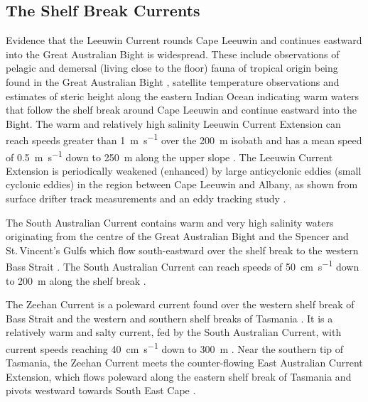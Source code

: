 \documentclass[preprint,3p,review,12pt]{elsarticle}
\begin{document}
\subsection{The Shelf Break Currents} \label{The Shelf Break Currents}
Evidence that the Leeuwin Current rounds Cape Leeuwin and continues eastward into the Great Australian Bight is widespread. These include observations of pelagic and demersal (living close to the floor) fauna of tropical origin being found in the Great Australian Bight \citep{Garrey1981}, satellite temperature observations \citep{Legeckis1981} and estimates of steric height along the eastern Indian Ocean \citep{Godfrey1985} indicating warm waters that follow the shelf break around Cape Leeuwin and continue eastward into the Bight. The warm and relatively high salinity Leeuwin Current Extension can reach speeds greater than \SI{1}{\meter\per\second} over the \SI{200}{\meter} isobath \citep{Cresswell1993} and has a mean speed of \SI{0.5}{\meter\per\second} down to \SI{250}{\meter} along the upper slope \citep{Cresswell2004}. The Leeuwin Current Extension is periodically weakened (enhanced) by large anticyclonic eddies (small cyclonic eddies) in the region between Cape Leeuwin and Albany, as shown from surface drifter track measurements \citep{Godfrey1986} and an eddy tracking study \citep{Cresswell2004}.

The South Australian Current contains warm and very high salinity waters originating from the centre of the Great Australian Bight \citep{Rochford1986} and the Spencer and St.\,Vincent's Gulfs \citep{Godfrey1986} which flow south-eastward over the shelf break to the western Bass Strait \citep{Ridgway2004}. The South Australian Current can reach speeds of \SI{50}{\centi\meter\per\second} down to \SI{200}{\meter} along the shelf break \citep{Middleton2007}.

The Zeehan Current is a poleward current found over the western shelf break of Bass Strait and the western and southern shelf breaks of Tasmania  \citep{Baines1983,Thompson1983}. It is a relatively warm and salty current, fed by the South Australian Current, with current speeds reaching \SI{40}{\centi\meter\per\second} down to \SI{300}{\meter} \citep{Ridgway2007}. Near the southern tip of Tasmania, the Zeehan Current meets the counter-flowing East Australian Current Extension, which flows poleward along the eastern shelf break of Tasmania and pivots westward towards South East Cape \citep{Cresswell2000,Oliver2016}.
\end{document}
